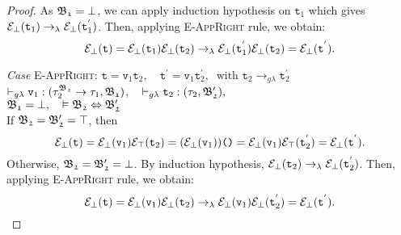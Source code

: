\begin{proof}
As $\mathfrak{B_{1}} = \bot$, we can apply induction hypothesis on
$\texttt{t}_{1}$ which gives  
$\mathcal{E}_{\bot}(\texttt{t}_{1}) \rightarrow_{\lambda} 
\mathcal{E}_{\bot}(\texttt{t}_{1}^{'})$.
Then, applying \textsc{E-AppRight} rule, we obtain:
$$
\mathcal{E}_{\bot}(\texttt{t}) 
= \mathcal{E}_{\bot}(\texttt{t}_{1})\mathcal{E}_{\bot}(\texttt{t}_{2})
\rightarrow_{\lambda} 
\mathcal{E}_{\bot}(\texttt{t}^{'}_{1})\mathcal{E}_{\bot}(\texttt{t}_{2})
= \mathcal{E}_{\bot}(\texttt{t}^{'}).$$




\noindent\textit{Case} \textsc{E-AppRight}: \qquad 
 $\texttt{t} = \texttt{v}_{1} \texttt{t}_{2},\quad
 \texttt{t}^{'} = \texttt{v}_{1} \texttt{t}^{'}_{2}, ~ \text{ with }
 \texttt{t}_{2} \rightarrow_{g\lambda} \texttt{t}^{'}_{2}$ \\
$\vdash_{g\lambda} \texttt{v}_{1} : (\tau_{2}^{\mathfrak{B_{2}}} \rightarrow \tau_{1}, \mathfrak{B_{1}})$,  ~
$\vdash_{g\lambda} \texttt{t}_{2} : (\tau_{2}, \mathfrak{B'_{2}}), $ \\ 
$ \mathfrak{B_{1}} = \bot,  \quad 
\vDash\mathfrak{B_{2}} \Leftrightarrow \mathfrak{B'_{2}} $ \\
If $\mathfrak{B_{2}} = \mathfrak{B'_{2}} = \top $, then
$$\mathcal{E}_{\bot}(\texttt{t}) 
= \mathcal{E}_{\bot}(\texttt{v}_{1})\mathcal{E}_{\top}(\texttt{t}_{2})
= (\mathcal{E}_{\bot}(\texttt{v}_{1}))\texttt{()}
= \mathcal{E}_{\bot}(\texttt{v}_{1})\mathcal{E}_{\top}(\texttt{t}^{'}_{2})
= \mathcal{E}_{\bot}(\texttt{t}^{'}). $$
Otherwise, $\mathfrak{B_{2}} = \mathfrak{B'_{2}} = \bot $.
By induction hypothesis, 
$\mathcal{E}_{\bot}(\texttt{t}_{2}) \rightarrow_{\lambda} 
\mathcal{E}_{\bot}(\texttt{t}_{2}^{'})$.
Then, applying \textsc{E-AppRight} rule, we obtain:
$$
\mathcal{E}_{\bot}(\texttt{t}) 
= \mathcal{E}_{\bot}(\texttt{v}_{1})\mathcal{E}_{\bot}(\texttt{t}_{2})
\rightarrow_{\lambda} 
\mathcal{E}_{\bot}(\texttt{v}_{1})\mathcal{E}_{\bot}(\texttt{t}^{'}_{2})
= \mathcal{E}_{\bot}(\texttt{t}^{'}).$$




%
%
 

\end{proof}


